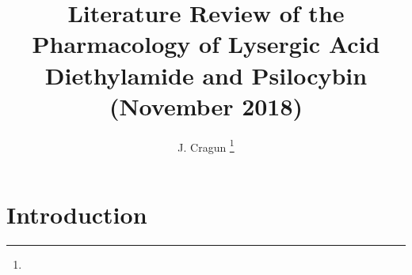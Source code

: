 \documentclass[journal,twoside,web]{ieeecolor}
\begin{document}
\title{Literature Review of the Pharmacology of Lysergic Acid Diethylamide and Psilocybin (November 2018)}
\author{J. Cragun \thanks{}}

\maketitle

\begin{abstract}

\end{abstract}

\section{Introduction}
\end{document}
